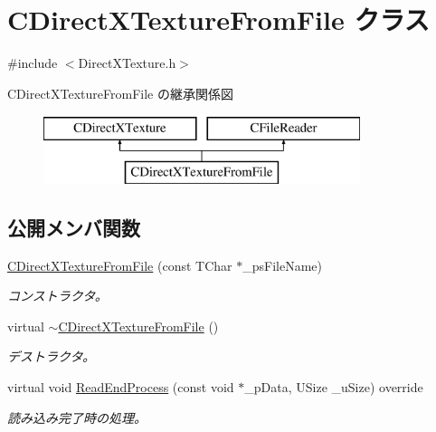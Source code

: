 \hypertarget{class_c_direct_x_texture_from_file}{}\section{C\+Direct\+X\+Texture\+From\+File クラス}
\label{class_c_direct_x_texture_from_file}


{\ttfamily \#include $<$Direct\+X\+Texture.\+h$>$}

C\+Direct\+X\+Texture\+From\+File の継承関係図\begin{figure}[H]
\begin{center}
\leavevmode
\includegraphics[height=2.000000cm]{class_c_direct_x_texture_from_file}
\end{center}
\end{figure}
\subsection*{公開メンバ関数}
\begin{DoxyCompactItemize}
\item 
\hyperlink{class_c_direct_x_texture_from_file_a3c104acd9cab3a866eff0fbb56a6fbd2}{C\+Direct\+X\+Texture\+From\+File} (const T\+Char $\ast$\+\_\+ps\+File\+Name)
\begin{DoxyCompactList}\small\item\em コンストラクタ。 \end{DoxyCompactList}\item 
virtual \hyperlink{class_c_direct_x_texture_from_file_a3922fe759e932141ac8e514c20f4f66f}{$\sim$\+C\+Direct\+X\+Texture\+From\+File} ()
\begin{DoxyCompactList}\small\item\em デストラクタ。 \end{DoxyCompactList}\item 
virtual void \hyperlink{class_c_direct_x_texture_from_file_a769ecff5e2d1bdc8fa292018bae7786a}{Read\+End\+Process} (const void $\ast$\+\_\+p\+Data, U\+Size \+\_\+u\+Size) override
\begin{DoxyCompactList}\small\item\em 読み込み完了時の処理。 \end{DoxyCompactList}\end{DoxyCompactItemize}
